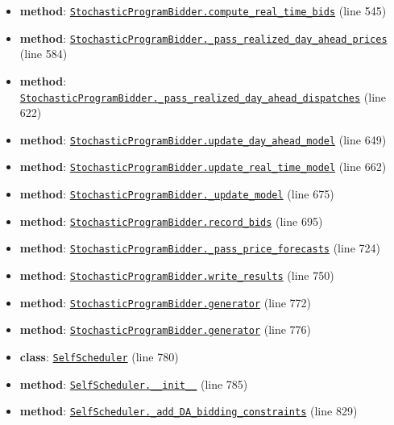 \documentclass[11pt]{report}
\begin{document}
\begin{itemize}[leftmargin=*]
  \item \textbf{method}: \hyperref[def:bidder.py:StochasticProgramBidder.compute_real_time_bids:L545]{\texttt{StochasticProgramBidder.compute\_real\_time\_bids}} (line 545)
  \item \textbf{method}: \hyperref[def:bidder.py:StochasticProgramBidder._pass_realized_day_ahead_prices:L584]{\texttt{StochasticProgramBidder.\_pass\_realized\_day\_ahead\_prices}} (line 584)
  \item \textbf{method}: \hyperref[def:bidder.py:StochasticProgramBidder._pass_realized_day_ahead_dispatches:L622]{\texttt{StochasticProgramBidder.\_pass\_realized\_day\_ahead\_dispatches}} (line 622)
  \item \textbf{method}: \hyperref[def:bidder.py:StochasticProgramBidder.update_day_ahead_model:L649]{\texttt{StochasticProgramBidder.update\_day\_ahead\_model}} (line 649)
  \item \textbf{method}: \hyperref[def:bidder.py:StochasticProgramBidder.update_real_time_model:L662]{\texttt{StochasticProgramBidder.update\_real\_time\_model}} (line 662)
  \item \textbf{method}: \hyperref[def:bidder.py:StochasticProgramBidder._update_model:L675]{\texttt{StochasticProgramBidder.\_update\_model}} (line 675)
  \item \textbf{method}: \hyperref[def:bidder.py:StochasticProgramBidder.record_bids:L695]{\texttt{StochasticProgramBidder.record\_bids}} (line 695)
  \item \textbf{method}: \hyperref[def:bidder.py:StochasticProgramBidder._pass_price_forecasts:L724]{\texttt{StochasticProgramBidder.\_pass\_price\_forecasts}} (line 724)
  \item \textbf{method}: \hyperref[def:bidder.py:StochasticProgramBidder.write_results:L750]{\texttt{StochasticProgramBidder.write\_results}} (line 750)
  \item \textbf{method}: \hyperref[def:bidder.py:StochasticProgramBidder.generator:L772]{\texttt{StochasticProgramBidder.generator}} (line 772)
  \item \textbf{method}: \hyperref[def:bidder.py:StochasticProgramBidder.generator:L776]{\texttt{StochasticProgramBidder.generator}} (line 776)
  \item \textbf{class}: \hyperref[def:bidder.py:SelfScheduler:L780]{\texttt{SelfScheduler}} (line 780)
  \item \textbf{method}: \hyperref[def:bidder.py:SelfScheduler.__init__:L785]{\texttt{SelfScheduler.\_\_init\_\_}} (line 785)
  \item \textbf{method}: \hyperref[def:bidder.py:SelfScheduler._add_DA_bidding_constraints:L829]{\texttt{SelfScheduler.\_add\_DA\_bidding\_constraints}} (line 829)

\end{itemize}
\end{document}
